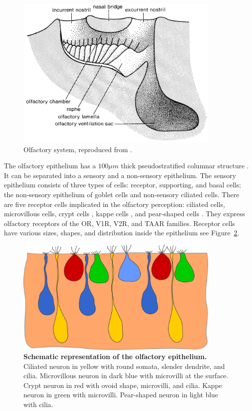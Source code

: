     \begin{figure}[h]
      \centering
      \includegraphics[width=10cm]{part_2/assets/olfactory_schematic.png}
      \caption{Olfactory system, reproduced from \cite{hara2012fish}.}
      \label{olfactory_schematic}
    \end{figure}


    The olfactory epithelium has a $100\mu m$ thick pseudostratified columnar structure \cite{hara2012fish}. It can be separated into a sensory and a non-sensory epithelium. The sensory epithelium consists of three types of cells: receptor, supporting, and basal cells; the non-sensory epithelium of goblet cells and non-sensory ciliated cells. There are five receptor cells implicated in the olfactory perception: ciliated cells, microvillous cells, crypt cells \cite{ichikawa1977fine,hansen2005diversity}, kappe cells \cite{ahuja2014kappe}, and pear-shaped cells \cite{wakisaka2017adenosine}. They express olfactory receptors of the OR, V1R, V2R, and TAAR families. Receptor cells have various sizes, shapes, and distribution inside the epithelium see Figure~\ref{olfactory_schematic_full}.

    \begin{figure}[h]
      \centering
      \includegraphics[width=10cm]{part_2/assets/olfactory_schematic_full.png}
      \caption{{\bf Schematic representation of the olfactory epithelium.} Ciliated neuron in yellow with round somata, slender dendrite, and cilia. Microvillous neuron in dark blue with microvilli at the surface. Crypt neuron in red with ovoid shape, microvilli, and cilia. Kappe neuron in green with microvilli. Pear-shaped neuron in light blue with cilia.}
      \label{olfactory_schematic_full}
    \end{figure}

